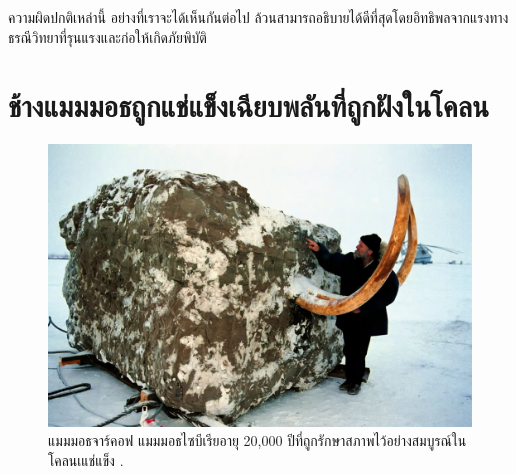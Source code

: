\documentclass[10pt,twocolumn,letterpaper]{article}
\begin{document}
ความผิดปกติเหล่านี้ อย่างที่เราจะได้เห็นกันต่อไป ล้วนสามารถอธิบายได้ดีที่สุดโดยอิทธิพลจากแรงทางธรณีวิทยาที่รุนแรงและก่อให้เกิดภัยพิบัติ

\section{ช้างแมมมอธถูกแช่แข็งเฉียบพลันที่ถูกฝังในโคลน}
\begin{figure}[b]
\begin{center}
   \includegraphics[width=1\linewidth]{jarkov-mammoth.jpg}
\end{center}
   \caption{แมมมอธจาร์คอฟ แมมมอธไซบีเรียอายุ 20,000 ปีที่ถูกรักษาสภาพไว้อย่างสมบูรณ์ในโคลนเแช่แข็ง \cite{51}.}
\label{fig:1}
\label{fig:onecol}
\end{figure}
\end{document}
